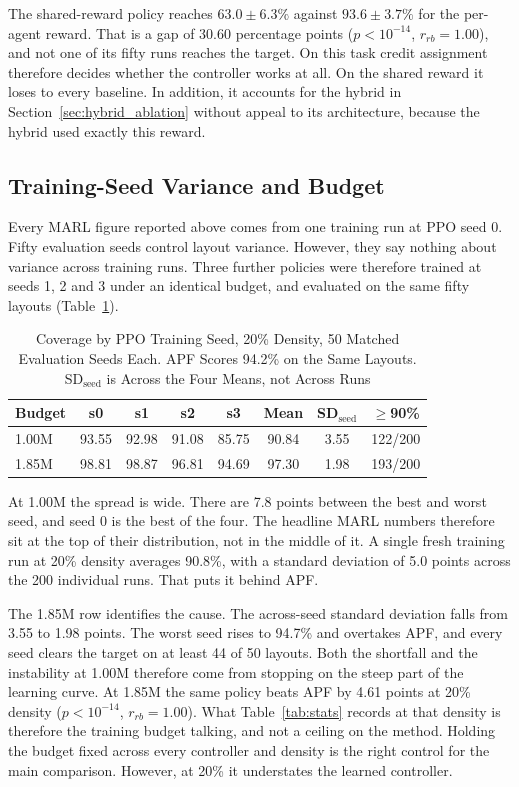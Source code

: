 \documentclass[a4paper, 10pt, conference]{ieeeconf}
\begin{document}
The shared-reward policy reaches $63.0\pm6.3\%$ against $93.6\pm3.7\%$
for the per-agent reward. That is a gap of $30.60$ percentage points
($p<10^{-14}$, $r_{rb}=1.00$), and not one of its fifty runs reaches
the target. On this task credit assignment therefore decides whether
the controller works at all. On the shared reward it loses to every
baseline. In addition, it accounts for the hybrid in
Section~\ref{sec:hybrid_ablation} without appeal to its architecture,
because the hybrid used exactly this reward.

\subsection{Training-Seed Variance and Budget}\label{sec:seedvar}

Every MARL figure reported above comes from one training run at PPO
seed 0. Fifty evaluation seeds control layout variance. However, they
say nothing about variance across training runs. Three further
policies were therefore trained at seeds 1, 2 and 3 under an identical
budget, and evaluated on the same fifty layouts
(Table~\ref{tab:seedvar}).

\begin{table}[htb]
\centering
\caption{Coverage by PPO Training Seed, 20\% Density, 50 Matched
Evaluation Seeds Each. APF Scores 94.2\% on the Same Layouts.
SD$_{\text{seed}}$ is Across the Four Means, not Across Runs}
\label{tab:seedvar}
\scriptsize
\setlength{\tabcolsep}{2pt}
\begin{tabular}{lccccccc}
\toprule
\textbf{Budget} & \textbf{s0} & \textbf{s1} & \textbf{s2} &
\textbf{s3} & \textbf{Mean} & \textbf{SD$_{\text{seed}}$} &
\textbf{$\geq$90\%} \\
\midrule
1.00M & 93.55 & 92.98 & 91.08 & 85.75 & 90.84 & 3.55 & 122/200 \\
1.85M & 98.81 & 98.87 & 96.81 & 94.69 & 97.30 & 1.98 & 193/200 \\
\bottomrule
\end{tabular}
\end{table}

At 1.00M the spread is wide. There are 7.8 points between the best and
worst seed, and seed 0 is the best of the four. The headline MARL
numbers therefore sit at the top of their distribution, not in the
middle of it. A single fresh training run at 20\% density averages
90.8\%, with a standard deviation of 5.0 points across the 200
individual runs. That puts it behind APF.

The 1.85M row identifies the cause. The across-seed standard deviation
falls from 3.55 to 1.98 points. The worst seed rises to 94.7\% and
overtakes APF, and every seed clears the target on at least 44 of 50
layouts. Both the shortfall and the instability at 1.00M therefore
come from stopping on the steep part of the learning curve. At 1.85M
the same policy beats APF by 4.61 points at 20\% density
($p<10^{-14}$, $r_{rb}=1.00$). What Table~\ref{tab:stats} records at
that density is therefore the training budget talking, and not a
ceiling on the method. Holding the budget fixed across every
controller and density is the right control for the main comparison.
However, at 20\% it understates the learned controller.
\end{document}
